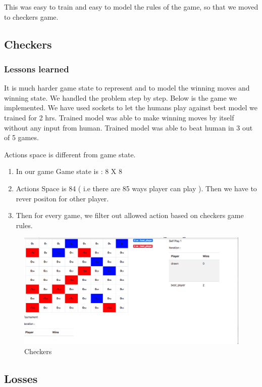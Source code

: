\documentclass{article}
\begin{document}
This was easy to train and easy to model the rules of the game, so that we moved to checkers game.

\subsection{Checkers}
\subsubsection{Lessons learned}
It is much harder game state to represent and to model the winning moves and winning state. We handled the problem step by step. Below is the game we implemented. We have used sockets to let the humans play against best model we trained for 2 hrs. Trained model was able to make winning moves by itself without any input from human. Trained model was able to beat human in 3 out of 5 games.

Actions space is different from game state.
    \begin{enumerate}
        \item In our game Game state is : 8 X 8
        \item Actions Space is 84 ( i.e there are 85 ways player can play ). Then we have to rever positon for other     player.
        \item Then for every game, we filter out allowed action based on checkers game rules.
    \end{enumerate}

\begin{figure}
    \centering
    \includegraphics[width=\textwidth,scale=0.1,]{checkers.png}
    \caption{Checkers}
    \label{fig:my_label}
\end{figure}


\subsection{Losses}
\end{document}
